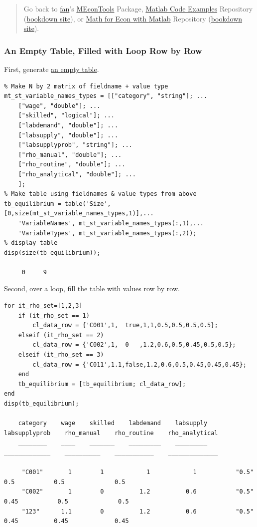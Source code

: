 \documentclass[
]{book}
\begin{document}
\begin{quote}
Go back to \href{http://fanwangecon.github.io/}{fan}'s \href{https://fanwangecon.github.io/MEconTools/}{MEconTools} Package, \href{https://fanwangecon.github.io/M4Econ/}{Matlab Code Examples} Repository (\href{https://fanwangecon.github.io/M4Econ/bookdown}{bookdown site}), or \href{https://fanwangecon.github.io/Math4Econ/}{Math for Econ with Matlab} Repository (\href{https://fanwangecon.github.io/Math4Econ/bookdown}{bookdown site}).
\end{quote}

\hypertarget{an-empty-table-filled-with-loop-row-by-row}{%
\subsubsection{An Empty Table, Filled with Loop Row by Row}\label{an-empty-table-filled-with-loop-row-by-row}}

First, generate \href{https://www.mathworks.com/matlabcentral/answers/244084-is-there-a-simpler-way-to-create-an-empty-table-with-a-list-of-variablenames\#answer_422250}{an empty
table}.

\begin{verbatim}
% Make N by 2 matrix of fieldname + value type
mt_st_variable_names_types = [["category", "string"]; ...
    ["wage", "double"]; ...
    ["skilled", "logical"]; ...
    ["labdemand", "double"]; ...
    ["labsupply", "double"]; ...
    ["labsupplyprob", "string"]; ...
    ["rho_manual", "double"]; ...
    ["rho_routine", "double"]; ...
    ["rho_analytical", "double"]; ...
    ];
% Make table using fieldnames & value types from above
tb_equilibrium = table('Size',[0,size(mt_st_variable_names_types,1)],... 
    'VariableNames', mt_st_variable_names_types(:,1),...
    'VariableTypes', mt_st_variable_names_types(:,2));
% display table
disp(size(tb_equilibrium));

     0     9
\end{verbatim}

Second, over a loop, fill the table with values row by row.

\begin{verbatim}
for it_rho_set=[1,2,3]
    if (it_rho_set == 1)
        cl_data_row = {'C001',1,  true,1,1,0.5,0.5,0.5,0.5};
    elseif (it_rho_set == 2)
        cl_data_row = {'C002',1,  0   ,1.2,0.6,0.5,0.45,0.5,0.5};
    elseif (it_rho_set == 3)
        cl_data_row = {'C011',1.1,false,1.2,0.6,0.5,0.45,0.45,0.45};
    end
    tb_equilibrium = [tb_equilibrium; cl_data_row];
end
disp(tb_equilibrium);

    category    wage    skilled    labdemand    labsupply    labsupplyprob    rho_manual    rho_routine    rho_analytical
    ________    ____    _______    _________    _________    _____________    __________    ___________    ______________

     "C001"       1        1            1            1           "0.5"            0.5           0.5              0.5     
     "C002"       1        0          1.2          0.6           "0.5"           0.45           0.5              0.5     
     "123"      1.1        0          1.2          0.6           "0.5"           0.45          0.45             0.45     
\end{verbatim}
\end{document}
